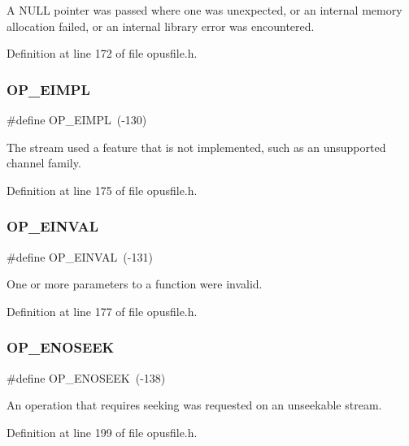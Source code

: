 A {\ttfamily N\+U\+LL} pointer was passed where one was unexpected, or an internal memory allocation failed, or an internal library error was encountered. 

Definition at line 172 of file opusfile.\+h.

\mbox{\label{group__error__codes_gaeea27378f826033ca23584d8403665d3}} 
\subsubsection{\texorpdfstring{OP\_EIMPL}{OP\_EIMPL}}
{\footnotesize\ttfamily \#define O\+P\+\_\+\+E\+I\+M\+PL~(-\/130)}

The stream used a feature that is not implemented, such as an unsupported channel family. 

Definition at line 175 of file opusfile.\+h.

\mbox{\label{group__error__codes_gae0879acafe9cc0ab72462d291fdb6fb6}} 
\subsubsection{\texorpdfstring{OP\_EINVAL}{OP\_EINVAL}}
{\footnotesize\ttfamily \#define O\+P\+\_\+\+E\+I\+N\+V\+AL~(-\/131)}

One or more parameters to a function were invalid. 

Definition at line 177 of file opusfile.\+h.

\mbox{\label{group__error__codes_gadd54f4d82cfabedb5963331fbe0bc99c}} 
\subsubsection{\texorpdfstring{OP\_ENOSEEK}{OP\_ENOSEEK}}
{\footnotesize\ttfamily \#define O\+P\+\_\+\+E\+N\+O\+S\+E\+EK~(-\/138)}

An operation that requires seeking was requested on an unseekable stream. 

Definition at line 199 of file opusfile.\+h.

